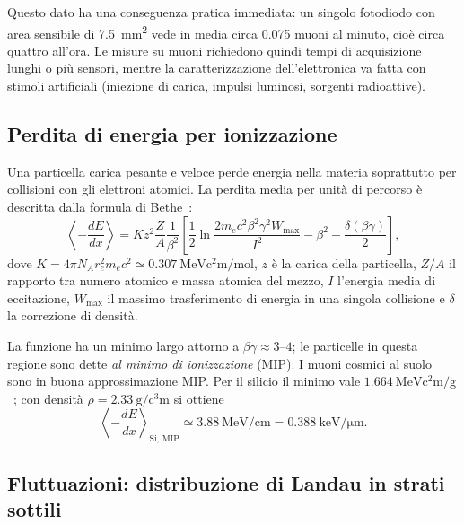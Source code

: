 \documentclass[11pt,a4paper]{article}
\begin{document}
Questo dato ha una conseguenza pratica immediata: un singolo fotodiodo con area sensibile di \SI{7.5}{\square\milli\metre} vede in media circa \num{0.075} muoni al minuto, cioè circa quattro all'ora. Le misure su muoni richiedono quindi tempi di acquisizione lunghi o più sensori, mentre la caratterizzazione dell'elettronica va fatta con stimoli artificiali (iniezione di carica, impulsi luminosi, sorgenti radioattive).

\subsection{Perdita di energia per ionizzazione}

Una particella carica pesante e veloce perde energia nella materia soprattutto per collisioni con gli elettroni atomici. La perdita media per unità di percorso è descritta dalla formula di Bethe~\cite{bethe1930,pdg2024}:
\begin{equation}
  \left\langle -\frac{dE}{dx} \right\rangle = K z^2 \frac{Z}{A}\frac{1}{\beta^2}\left[\frac{1}{2}\ln\frac{2 m_e c^2 \beta^2\gamma^2 W_{\max}}{I^2} - \beta^2 - \frac{\delta(\beta\gamma)}{2}\right],
  \label{eq:bethe}
\end{equation}
dove $K = 4\pi N_A r_e^2 m_e c^2 \simeq \SI{0.307}{\mega\electronvolt\square\centi\metre\per\mole}$, $z$ è la carica della particella, $Z/A$ il rapporto tra numero atomico e massa atomica del mezzo, $I$ l'energia media di eccitazione, $W_{\max}$ il massimo trasferimento di energia in una singola collisione e $\delta$ la correzione di densità.

La funzione ha un minimo largo attorno a $\beta\gamma \approx 3$--$4$; le particelle in questa regione sono dette \emph{al minimo di ionizzazione} (MIP). I muoni cosmici al suolo sono in buona approssimazione MIP. Per il silicio il minimo vale $\SI{1.664}{\mega\electronvolt\square\centi\metre\per\gram}$~\cite{pdg2024,groom2001}; con densità $\rho = \SI{2.33}{\gram\per\cubic\centi\metre}$ si ottiene
\begin{equation}
  \left\langle -\frac{dE}{dx} \right\rangle_{\mathrm{Si,\,MIP}} \simeq \SI{3.88}{\mega\electronvolt\per\centi\metre} = \SI{0.388}{\kilo\electronvolt\per\micro\metre}.
\end{equation}

\subsection{Fluttuazioni: distribuzione di Landau in strati sottili}
\end{document}
